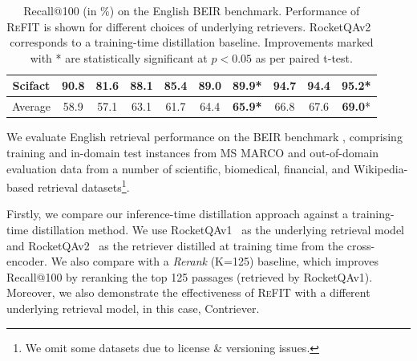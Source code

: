 \begin{table}[t]
\begin{tabular}{c|cc:cccc|ccc}
       Scifact   & 90.8  & 81.6  & 88.1	&85.4	&89.0	&\textbf{89.9*}  & 94.7&  94.4 & \textbf{95.2*}\\
       \hline
       Average& 58.9  & 57.1 & 63.1	&61.7	&64.4	&\textbf{65.9*}  & 66.8 & 67.6  & \textbf{69.0}* \\
       \hline
    \end{tabular}
    \caption{Recall@100 (in \%) on the English BEIR benchmark. Performance of \textsc{ReFIT} is shown for different choices of underlying retrievers. RocketQAv2~\cite{ren2021rocketqav2} corresponds to a training-time distillation baseline. Improvements marked with * are statistically significant at $p<0.05$ as per paired t-test.}
    \label{tab:beir_nums}
\end{table}

We evaluate English retrieval performance on the BEIR benchmark \cite{thakur2021beir}, comprising training and in-domain test instances from MS MARCO and out-of-domain evaluation data from a number of scientific, biomedical, financial, and Wikipedia-based retrieval datasets\footnote{We omit some datasets due to license \& versioning issues.}. 

Firstly, we compare our inference-time distillation approach against a training-time distillation method. We use RocketQAv1~\cite{qu-etal-2021-rocketqa} as the underlying retrieval model and RocketQAv2~\cite{ren-etal-2021-rocketqav2} as the retriever distilled at training time from the cross-encoder. We also compare with a \textit{Rerank} (K=125) baseline, which improves Recall@100 by reranking the top 125 passages (retrieved by RocketQAv1). Moreover, we also demonstrate the effectiveness of \textsc{ReFIT} with a different underlying retrieval model, in this case, Contriever.

